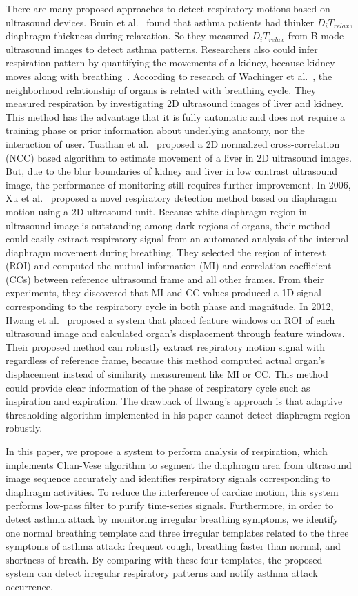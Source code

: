 There are many proposed approaches to detect respiratory motions based on ultrasound devices. Bruin et al.~\cite{Bruin:1997} found that asthma patients had thinker $D_iT_{relax}$, diaphragm thickness during relaxation. So they measured $D_iT_{relax}$ from B-mode ultrasound images to detect asthma patterns.
Researchers also could infer respiration pattern by quantifying the movements of a kidney, because kidney moves along with breathing~\cite{Laurent:1994}. According to research of Wachinger et al.~\cite{Christian:2011}, the neighborhood relationship of organs is related with breathing cycle. They measured respiration by investigating 2D ultrasound images of liver and kidney. This method has the advantage that it is fully automatic and does not require a training phase or prior information about underlying anatomy, nor the interaction of user.
Tuathan et al.~\cite{Tuathan:2014} proposed a 2D normalized cross-correlation (NCC) based algorithm to estimate movement of a liver in 2D ultrasound images. But, due to the blur boundaries of kidney and liver in low contrast ultrasound image, the performance of  monitoring still requires further improvement.
In 2006, Xu et al.~\cite{Xu:2006} proposed a novel respiratory detection method based on diaphragm motion using a 2D ultrasound unit. Because white diaphragm region in ultrasound image is outstanding among  dark regions of organs, their method could easily extract respiratory signal from an automated analysis of the internal diaphragm movement during breathing. They selected the region of interest (ROI) and computed the mutual information (MI) and correlation coefficient (CCs) between reference ultrasound frame and all other frames. From their experiments, they discovered that MI and CC values produced a 1D signal corresponding to the respiratory cycle in both phase and magnitude.
In 2012, Hwang et al.~\cite{Youngkyoo:2012} proposed a system that placed feature windows on ROI of each ultrasound image and calculated organ's displacement through feature windows. Their proposed method can robustly extract respiratory motion signal with regardless of reference frame, because this method computed actual organ's displacement instead of similarity measurement like MI or CC. This method could provide clear information of the phase of respiratory cycle such as inspiration and expiration. The drawback of Hwang's approach is that adaptive thresholding algorithm implemented in his paper cannot detect diaphragm region robustly.

In this paper, we propose a system to perform analysis of respiration, which implements Chan-Vese algorithm to segment the diaphragm area from ultrasound image sequence accurately and identifies respiratory signals corresponding to diaphragm activities. To reduce the interference of cardiac motion, this system performs low-pass filter to purify time-series signals. Furthermore, in order to detect asthma attack by monitoring irregular breathing symptoms, we identify one normal breathing template and three irregular templates related to the three symptoms of asthma attack: frequent cough, breathing faster than normal, and shortness of breath. By comparing with these four templates, the proposed system can detect irregular respiratory patterns and notify asthma attack occurrence. 